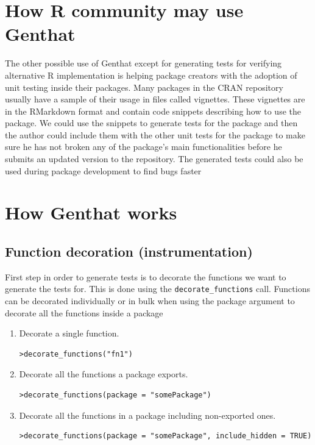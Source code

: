 \documentclass[thesis=B,english]{FITthesis}[2012/10/20]
\begin{document}
\section{How R community may use Genthat}
The other possible use of Genthat except for generating tests for verifying alternative R implementation is helping package creators with the adoption of unit testing inside their packages. Many packages in the CRAN repository usually have a sample of their usage in files called vignettes. These vignettes are in the RMarkdown format and contain code snippets describing how to use the package. We could use the snippets to generate tests for the package and then the author could include them with the other unit tests for the package to make sure he has not broken any of the package’s main functionalities before he submits an updated version to the repository. The generated tests could also be used during package development to find bugs faster 

\section{How Genthat works}
\subsection{Function decoration (instrumentation)}
First step in order to generate tests is to decorate the functions we want to generate the tests for. This is done using the \verb|decorate_functions| call. Functions can be decorated individually or in bulk when using the package argument to decorate all the functions inside a package

\begin{enumerate}
\item Decorate a single function.
\begin{verbatim}
>decorate_functions("fn1")
\end{verbatim}
\item Decorate all the functions a package exports.
\begin{verbatim}
>decorate_functions(package = "somePackage")
\end{verbatim}
\item Decorate all the functions in a package including non-exported ones.
\begin{verbatim}
>decorate_functions(package = "somePackage", include_hidden = TRUE)
\end{verbatim}
\end{enumerate}
\end{document}
